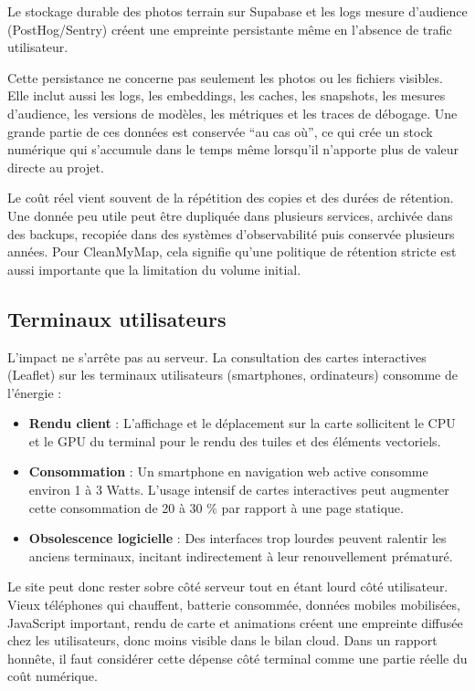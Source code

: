 \documentclass[
  10pt,
  a4paper,
  DIV=11,
  numbers=noendperiod,
  oneside]{scrreprt}
\providecommand{\tightlist}{%
  \setlength{\itemsep}{0pt}\setlength{\parskip}{0pt}}
\let\oldtextbf\textbf
\renewcommand{\textbf}[1]{\oldtextbf{\textcolor{cmmnavy}{#1}}}
\begin{document}
Le stockage durable des photos terrain sur Supabase et les logs mesure
d'audience (PostHog/Sentry) créent une empreinte persistante même en
l'absence de trafic utilisateur.

Cette persistance ne concerne pas seulement les photos ou les fichiers
visibles. Elle inclut aussi les logs, les embeddings, les caches, les
snapshots, les mesures d'audience, les versions de modèles, les
métriques et les traces de débogage. Une grande partie de ces données
est conservée ``au cas où'', ce qui crée un stock numérique qui
s'accumule dans le temps même lorsqu'il n'apporte plus de valeur directe
au projet.

Le coût réel vient souvent de la répétition des copies et des durées de
rétention. Une donnée peu utile peut être dupliquée dans plusieurs
services, archivée dans des backups, recopiée dans des systèmes
d'observabilité puis conservée plusieurs années. Pour CleanMyMap, cela
signifie qu'une politique de rétention stricte est aussi importante que
la limitation du volume initial.

\subsection{Terminaux utilisateurs}\label{terminaux-utilisateurs}

L'impact ne s'arrête pas au serveur. La consultation des cartes
interactives (Leaflet) sur les terminaux utilisateurs (smartphones,
ordinateurs) consomme de l'énergie :

\begin{itemize}
\tightlist
\item
  \textbf{Rendu client} : L'affichage et le déplacement sur la carte
  sollicitent le CPU et le GPU du terminal pour le rendu des tuiles et
  des éléments vectoriels.
\item
  \textbf{Consommation} : Un smartphone en navigation web active
  consomme environ 1 à 3 Watts. L'usage intensif de cartes interactives
  peut augmenter cette consommation de 20 à 30 \% par rapport à une page
  statique.
\item
  \textbf{Obsolescence logicielle} : Des interfaces trop lourdes peuvent
  ralentir les anciens terminaux, incitant indirectement à leur
  renouvellement prématuré.
\end{itemize}

Le site peut donc rester sobre côté serveur tout en étant lourd côté
utilisateur. Vieux téléphones qui chauffent, batterie consommée, données
mobiles mobilisées, JavaScript important, rendu de carte et animations
créent une empreinte diffusée chez les utilisateurs, donc moins visible
dans le bilan cloud. Dans un rapport honnête, il faut considérer cette
dépense côté terminal comme une partie réelle du coût numérique.
\end{document}

